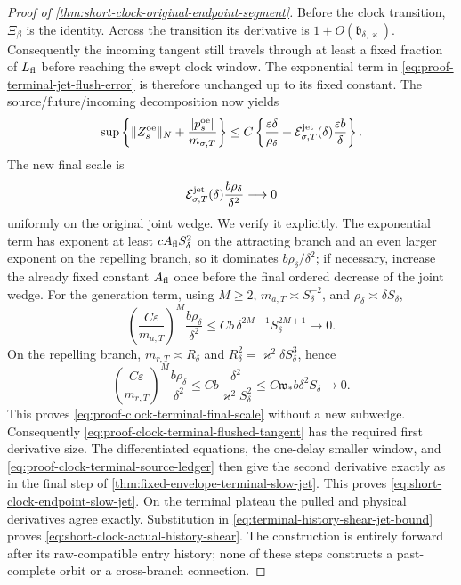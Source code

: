 \begin{proof}[Proof of
\cref{thm:short-clock-original-endpoint-segment}]
Before the clock transition, \(\Xi_\beta\) is the identity.  Across the
transition its derivative is \(1+O(\mathfrak b_{\delta,\varkappa})\).
Consequently the incoming tangent still travels through at least a fixed
fraction of \(L_{\rm fl}\) before reaching the swept clock window.  The
exponential term in \cref{eq:proof-terminal-jet-flush-error} is therefore
unchanged up to its fixed constant.  The source/future/incoming
decomposition now yields
\begin{equation}
 \sup\left\{\|Z_s^{\rm oe}\|_N
       +\frac{|p_s^{\rm oe}|}{m_{\sigma,T}}\right\}
 \le C\left\{\frac{\varepsilon\delta}{\rho_\delta}
       +\mathcal E_{\sigma,T}^{\rm jet}(\delta)
          \frac{\varepsilon b}{\delta}\right\}.          \label{eq:proof-clock-terminal-flushed-tangent}
\end{equation}
The new final scale is
\begin{equation}
 \mathcal E_{\sigma,T}^{\rm jet}(\delta)
       \frac{b\rho_\delta}{\delta^2}\longrightarrow0     \label{eq:proof-clock-terminal-final-scale}
\end{equation}
uniformly on the original joint wedge.  We verify it explicitly.  The
exponential term has exponent at least
\(cA_{\rm fl}S_\delta^2\) on the attracting branch and an even larger
exponent on the repelling branch, so it dominates
\(b\rho_\delta/\delta^2\); if necessary, increase the already fixed
constant \(A_{\rm fl}\) once before the final ordered decrease of the
joint wedge.  For the generation term, using \(M\ge2\),
\(m_{a,T}\asymp S_\delta^{-2}\), and
\(\rho_\delta\asymp\delta S_\delta\),
\[
 \left(\frac{C\varepsilon}{m_{a,T}}\right)^M
       \frac{b\rho_\delta}{\delta^2}
 \le Cb\,\delta^{2M-1}S_\delta^{2M+1}\longrightarrow0.
\]
On the repelling branch, \(m_{r,T}\asymp R_\delta\) and
\(R_\delta^2=\varkappa^2\delta S_\delta^3\), hence
\[
 \left(\frac{C\varepsilon}{m_{r,T}}\right)^M
       \frac{b\rho_\delta}{\delta^2}
 \le Cb\frac{\delta^2}{\varkappa^2S_\delta^2}
 \le C\mathfrak w_*b\delta^2S_\delta\longrightarrow0.
\]
This proves \cref{eq:proof-clock-terminal-final-scale} without a new
subwedge.  Consequently
\cref{eq:proof-clock-terminal-flushed-tangent} has the required first
derivative size.  The differentiated equations, the one-delay smaller
window, and \cref{eq:proof-clock-terminal-source-ledger} then give the
second derivative exactly as in the final step of
\cref{thm:fixed-envelope-terminal-slow-jet}.  This proves
\cref{eq:short-clock-endpoint-slow-jet}.  On the terminal plateau the
pulled and physical derivatives agree exactly.  Substitution in
\cref{eq:terminal-history-shear-jet-bound} proves
\cref{eq:short-clock-actual-history-shear}.  The construction is entirely
forward after its raw-compatible entry history; none of these steps
constructs a past-complete orbit or a cross-branch connection.
\end{proof}

